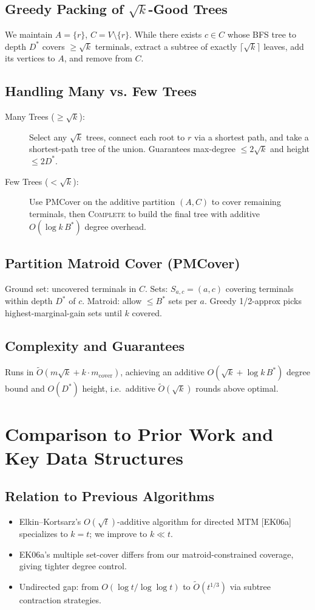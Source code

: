 \documentclass[12pt]{article}
\begin{document}
\subsection{Greedy Packing of $\sqrt{k}$-Good Trees}
We maintain $A=\{r\}$, $C=V\setminus\{r\}$. While there exists $c\in C$ whose BFS tree to depth $D^*$ covers $\ge\sqrt{k}$ terminals, extract a subtree of exactly $\lceil\sqrt{k}\rceil$ leaves, add its vertices to $A$, and remove from $C$.

\subsection{Handling Many vs. Few Trees}
\begin{description}
  \item[Many Trees ($\ge\sqrt{k}$):] Select any $\sqrt{k}$ trees, connect each root to $r$ via a shortest path, and take a shortest-path tree of the union. Guarantees max-degree $\le2\sqrt{k}$ and height $\le2D^*$.
  \item[Few Trees ($<\sqrt{k}$):] Use PMCover on the additive partition $(A,C)$ to cover remaining terminals, then \textsc{Complete} to build the final tree with additive $O(\log k\,B^*)$ degree overhead.
\end{description}

\subsection{Partition Matroid Cover (PMCover)}
Ground set: uncovered terminals in $C$. Sets: $S_{a,c}=(a,c)$ covering terminals within depth $D^*$ of $c$. Matroid: allow $\le B^*$ sets per $a$. Greedy 1/2-approx picks highest-marginal-gain sets until $k$ covered.

\subsection{Complexity and Guarantees}
Runs in $\tilde O(m\sqrt{k} + k\cdot m_{\mathrm{cover}})$, achieving an additive $O(\sqrt{k}+\log k\,B^*)$ degree bound and $O(D^*)$ height, i.e.\ additive $\tilde O(\sqrt{k})$ rounds above optimal.

\section{Comparison to Prior Work and Key Data Structures}
\subsection{Relation to Previous Algorithms}
\begin{itemize}
  \item Elkin–Kortsarz's $O(\sqrt{t})$-additive algorithm for directed MTM [EK06a] specializes to $k=t$; we improve to $k\ll t$.  
  \item EK06a's multiple set-cover differs from our matroid-constrained coverage, giving tighter degree control.  
  \item Undirected gap: from $O(\log t/\log\log t)$ to $\tilde O(t^{1/3})$ via subtree contraction strategies.
\end{itemize}
\end{document}
